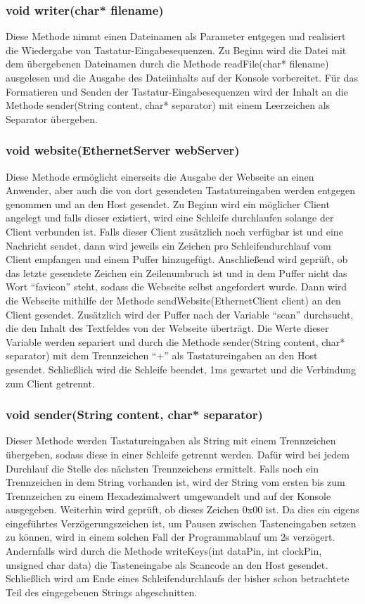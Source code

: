 \subsubsection{void writer(char* filename)}
Diese Methode nimmt einen Dateinamen als Parameter entgegen und realisiert die Wiedergabe von Tastatur-Eingabesequenzen. Zu Beginn wird die Datei mit dem übergebenen Dateinamen durch die Methode readFile(char* filename) ausgelesen und die Ausgabe des Dateiinhalts auf der Konsole vorbereitet. Für das Formatieren und Senden der Tastatur-Eingabesequenzen wird der Inhalt an die Methode sender(String content, char* separator) mit einem Leerzeichen als Separator übergeben.

\subsubsection{void website(EthernetServer webServer)}
Diese Methode ermöglicht einerseits die Ausgabe der Webseite an einen Anwender, aber auch die von dort gesendeten Tastatureingaben werden entgegen genommen und an den Host gesendet. Zu Beginn wird ein möglicher Client angelegt und falls dieser existiert, wird eine Schleife durchlaufen solange der Client verbunden ist. Falls dieser Client zusätzlich noch verfügbar ist und eine Nachricht sendet, dann wird jeweils ein Zeichen pro Schleifendurchlauf vom Client empfangen und einem Puffer hinzugefügt. Anschließend wird geprüft, ob das letzte gesendete Zeichen ein Zeilenumbruch ist und in dem Puffer nicht das Wort ``favicon'' steht, sodass die Webseite selbst angefordert wurde. Dann wird die Webseite mithilfe der Methode sendWebsite(EthernetClient client) an den Client gesendet. Zusätzlich wird der Puffer nach der Variable ``scan'' durchsucht, die den Inhalt des Textfeldes von der Webseite überträgt. Die Werte dieser Variable werden separiert und durch die Methode sender(String content, char* separator) mit dem Trennzeichen ``+'' als Tastatureingaben an den Host gesendet. Schließlich wird die Schleife beendet, 1ms gewartet und die Verbindung zum Client getrennt.

\subsubsection{void sender(String content, char* separator)}
Dieser Methode werden Tastatureingaben als String mit einem Trennzeichen übergeben, sodass diese in einer Schleife getrennt werden. Dafür wird bei jedem Durchlauf die Stelle des nächsten Trennzeichens ermittelt. Falls noch ein Trennzeichen in dem String vorhanden ist, wird der String vom ersten bis zum Trennzeichen zu einem Hexadezimalwert umgewandelt und auf der Konsole ausgegeben. Weiterhin wird geprüft, ob dieses Zeichen 0x00 ist. Da dies ein eigens eingeführtes Verzögerungszeichen ist, um Pausen zwischen Tasteneingaben setzen zu können, wird in einem solchen Fall der Programmablauf um 2s verzögert. Andernfalls wird durch die Methode writeKeys(int dataPin, int clockPin, unsigned char data) die Tasteneingabe als Scancode an den Host gesendet. Schließlich wird am Ende eines Schleifendurchlaufs der bisher schon betrachtete Teil des eingegebenen Strings abgeschnitten.



